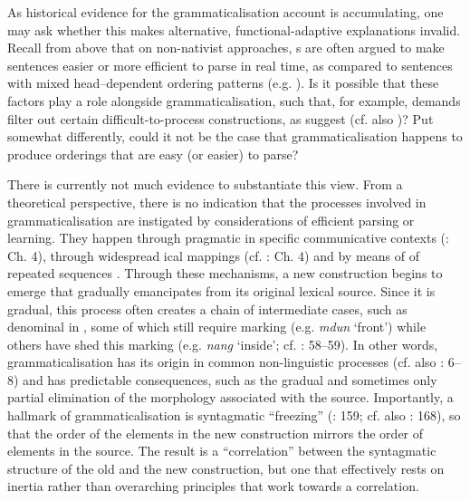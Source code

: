 \documentclass[output=paper]{langsci/langscibook}
\begin{document}
As historical evidence for the grammaticalisation account is accumulating, one may ask whether this makes alternative, functional-adaptive explanations invalid. Recall from above that on non-nativist approaches, s are often argued to make sentences easier or more efficient to parse in real time, as compared to sentences with mixed head–dependent ordering patterns (e.g. \citealt{Hawkins2004}). Is it possible that these factors play a role alongside grammaticalisation, such that, for example,  demands filter out certain difficult-to-process constructions, as \citet{KirbyHurford1997} suggest (cf. also \citealt{Christiansen2000})? Put somewhat differently, could it not be the case that grammaticalisation happens to produce orderings that are easy (or easier) to parse?

There is currently not much evidence to substantiate this view. From a theoretical perspective, there is no indication that the processes involved in grammaticalisation are instigated by considerations of efficient parsing or learning. They happen through pragmatic  in specific communicative contexts (\citealt{HopperTraugott2003}: Ch. 4), through widespread ical mappings (cf. \citealt{Deutscher2005}: Ch. 4) and by means of  of repeated sequences \citep{Bybee2002}. Through these mechanisms, a new construction begins to emerge that gradually emancipates from its original lexical source. Since it is gradual, this process often creates a chain of intermediate cases, such as denominal  in , some of which still require  marking (e.g. \textit{mdun} ‘front’) while others have shed this marking (e.g. \textit{nang} ‘inside’; cf. \citealt{DeLancey1997}: 58–59). In other words, grammaticalisation has its origin in common non-linguistic processes (cf. also \citealt{Bybee2010}: 6–8) and has predictable consequences, such as the gradual and sometimes only partial elimination of the morphology associated with the source. Importantly, a hallmark of grammaticalisation is syntagmatic “freezing” (\citealt{Croft2000}: 159; cf. also \citealt{Lehmann2015}: 168), so that the order of the elements in the new construction mirrors the order of elements in the source. The result is a “correlation” between the syntagmatic structure of the old and the new construction, but one that effectively rests on inertia rather than overarching  principles that work towards a correlation.
\end{document}
